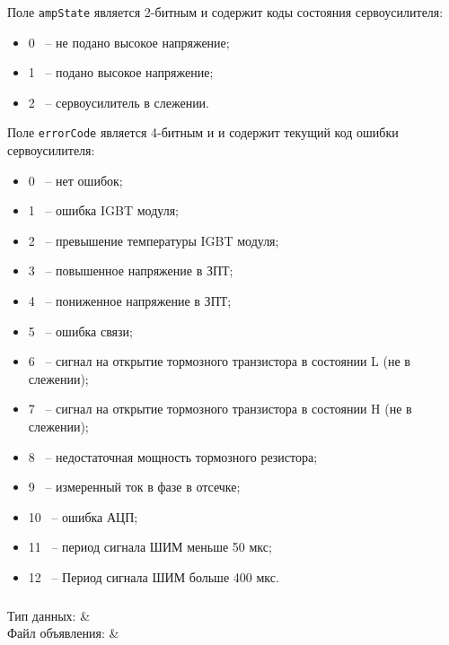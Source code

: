 Поле \texttt{ampState} является 2-битным и содержит коды состояния сервоусилителя:
\begin{itemize}
\item 0 ~-- не подано высокое напряжение; \killoverfullbefore
\item 1 ~-- подано высокое напряжение; \killoverfullbefore
\item 2 ~-- сервоусилитель в слежении. \killoverfullbefore \BL
\end{itemize} 

Поле \texttt{errorCode} является 4-битным и и содержит текущий код ошибки сервоусилителя:
\begin{itemize}
\item 0 ~-- нет ошибок; \killoverfullbefore
\item 1 ~-- ошибка IGBT модуля; \killoverfullbefore
\item 2 ~-- превышение температуры IGBT модуля; \killoverfullbefore 
\item 3 ~-- повышенное напряжение в ЗПТ;
\item 4 ~-- пониженное напряжение в ЗПТ;
\item 5 ~-- ошибка связи;
\item 6 ~-- сигнал на открытие тормозного транзистора в состоянии L (не в слежении);
\item 7 ~-- сигнал на открытие тормозного транзистора в состоянии H (не в слежении);
\item 8 ~-- недостаточная мощность тормозного резистора;
\item 9 ~-- измеренный ток в фазе в отсечке;
\item 10 ~-- ошибка АЦП;
\item 11 ~-- период сигнала ШИМ меньше 50 мкс;
\item 12 ~-- Период сигнала ШИМ больше 400 мкс.\BL
\end{itemize} 

\clearpage
\subsubsection{}
\label{sec:EncoderErrors}

\begin{fHeader}
    Тип данных:            & \\
    Файл объявления:             &  \\
\end{fHeader}

